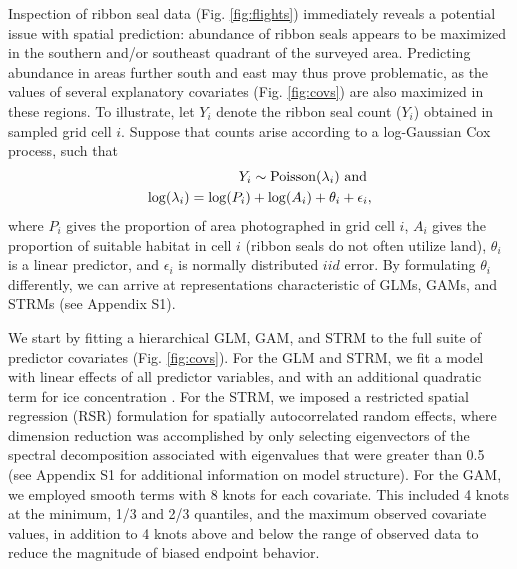 \documentclass[12pt,english]{article}
\begin{document}
\begin{spacing}{1.9}
Inspection of ribbon seal data (Fig. \ref{fig:flights}) immediately reveals a potential
issue with spatial prediction: abundance of ribbon seals appears to be maximized in the southern and/or southeast quadrant of the surveyed area.  Predicting abundance in areas further south and east may thus prove problematic, as the values of several explanatory covariates (Fig. \ref{fig:covs}) are also maximized in these regions.  To illustrate, let $Y_i$ denote the ribbon seal count ($Y_i$) obtained in sampled grid cell $i$.  Suppose that counts arise according to a log-Gaussian Cox process, such that
\begin{eqnarray}
  \label{eqn:Cox}
  Y_i \sim {\rm Poisson}(\lambda_i) \mbox{ and } \\
  \log(\lambda_i) = \log(P_i) + \log(A_i) + \theta_i + \epsilon_i, \nonumber
\end{eqnarray}
where $P_i$ gives the proportion of area photographed in grid cell $i$, $A_i$ gives the proportion of suitable habitat in cell $i$ (ribbon seals do not often utilize land), $\theta_i$ is a linear predictor, and $\epsilon_i$ is normally distributed $iid$ error.  By formulating $\theta_i$ differently, we can arrive at representations characteristic of GLMs, GAMs, and STRMs (see Appendix S1).

We start by fitting a hierarchical GLM, GAM, and STRM to the full suite of predictor covariates (Fig. \ref{fig:covs}).  For the GLM and STRM, we fit a model with linear effects of all predictor variables, and with an additional quadratic term for ice concentration \citep[seal density is often maximized at an intermediate value of ice concentration; see][]{VerHoef2013,ConnEtAl2014}. For the STRM, we imposed a restricted spatial regression (RSR) formulation for spatially autocorrelated random effects, where dimension reduction was accomplished by only selecting eigenvectors of the spectral decomposition associated with eigenvalues that were greater than 0.5 (see Appendix S1 for additional information on model structure).  For the GAM, we employed smooth terms with 8 knots for each covariate.  This included 4 knots at the minimum, 1/3 and 2/3 quantiles, and the maximum observed covariate values, in addition to 4 knots above and below the range of observed data to reduce the magnitude of biased endpoint behavior.


\end{spacing}
\end{document}
